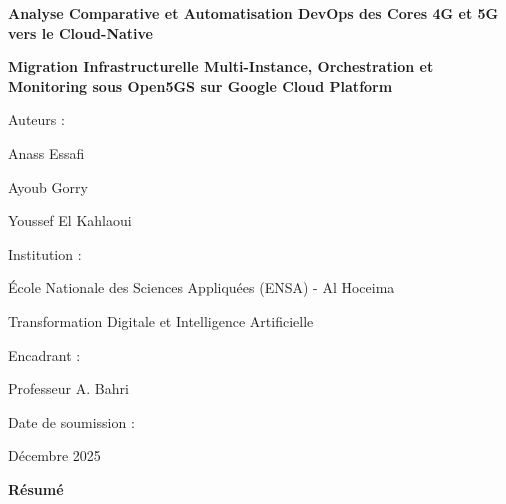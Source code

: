 \documentclass[12pt,a4paper]{report}
\begin{document}
\begin{titlepage}
    \centering
    \vspace*{2cm}
    
    {\Huge\bfseries Analyse Comparative et Automatisation DevOps des Cores 4G et 5G vers le Cloud-Native \par}
    \vspace{1cm}
    {\Large\bfseries Migration Infrastructurelle Multi-Instance, Orchestration et Monitoring sous Open5GS sur Google Cloud Platform\par}
    \vspace{3cm}
    
    {\Large Auteurs :\par}
    \vspace{0.3cm}
    {\large Anass Essafi~\cite{essafi}\par}
    {\large Ayoub Gorry~\cite{gorry}\par}
    {\large Youssef El Kahlaoui~\cite{elkahlaoui}\par}

    \vspace{1cm}
    
    {\Large Institution :\par}
    \vspace{0.3cm}
    {\large École Nationale des Sciences Appliquées (ENSA) - Al Hoceima\par}
    {\large Transformation Digitale et Intelligence Artificielle \par}
    \vspace{1cm}
    
    {\Large Encadrant :\par}
    \vspace{0.3cm}
    {\large Professeur A. Bahri~\cite{bahri}\par}
    \vspace{1cm}
    
    {\Large Date de soumission :\par}
    \vspace{0.3cm}
    {\large Décembre 2025\par}
    
    \vfill 
    \vspace{15cm}

    {\Large\bfseries Résumé\par}
    \vspace{0.5cm}
    

\end{titlepage}
\end{document}
